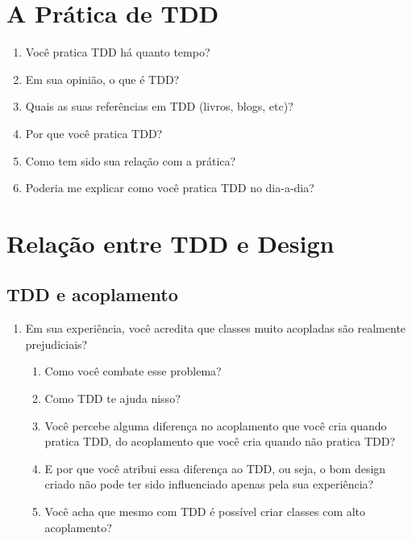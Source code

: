 \section{A Prática de TDD}
\label{entrevista:pratica}

\begin{enumerate}
	\item Você pratica TDD há quanto tempo?

	\item Em sua opinião, o que é TDD?
	
	\item Quais as suas referências em TDD (livros, blogs, etc)?

	\item Por que você pratica TDD?

	\item Como tem sido sua relação com a prática?

	\item Poderia me explicar como você pratica TDD no dia-a-dia?

\end{enumerate}

\section{Relação entre TDD e Design}

\subsection{TDD e acoplamento}
\label{entrevista:acoplamento}

\begin{enumerate}
	\item{Em sua experiência, você acredita que classes muito acopladas são realmente prejudiciais?}
		\begin{enumerate}
			\item Como você combate esse problema?

			\item Como TDD te ajuda nisso?
			
			\item Você percebe alguma diferença no acoplamento que você cria quando
			pratica TDD, do acoplamento que você cria quando não pratica TDD?
			
			\item E por que você atribui essa diferença ao TDD, ou seja, o bom design
			criado não pode ter sido influenciado apenas pela sua experiência?

			\item Você acha que mesmo com TDD é possível criar classes com alto acoplamento? 
		\end{enumerate}
\end{enumerate}

